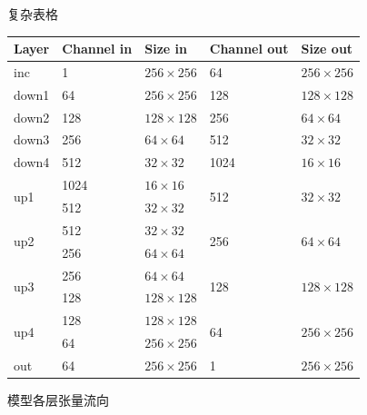 \documentclass{beamer}
\begin{document}
\begin{frame}{复杂表格}
    \centering
    \begin{table}[htb]
        \centering
        \small
        \begin{tabular}{p{2.5cm}p{4cm}p{4cm}p{4cm}p{3.5cm}}
            \toprule
            \textbf{Layer} & \textbf{Channel in} & \textbf{Size in} & \textbf{Channel out} & \textbf{Size out}\\
            \midrule
            inc & 1 & $256\times256$ & 64 & $256\times256$\\
            \midrule
            down1 & 64 & $256\times256$ & 128 & $128\times128$\\
            down2 & 128 & $128\times128$ & 256 & $64\times64$\\
            down3 & 256 & $64\times64$ & 512 & $32\times32$\\
            down4 & 512 & $32\times32$ & 1024 & $16\times16$\\
            \midrule
            \multirow{2}{*}{up1} & 1024 & $16\times16$ & \multirow{2}{*}{512} & \multirow{2}{*}{$32\times32$}\\
             & 512 & $32\times32$ &  & \\
            \midrule
            \multirow{2}{*}{up2} & 512 & $32\times32$ & \multirow{2}{*}{256} & \multirow{2}{*}{$64\times64$}\\
             & 256 & $64\times64$ &  & \\
            \midrule
            \multirow{2}{*}{up3} & 256 & $64\times64$ & \multirow{2}{*}{128} & \multirow{2}{*}{$128\times128$}\\
             & 128 & $128\times128$ &  & \\
            \midrule
            \multirow{2}{*}{up4} & 128 & $128\times128$ & \multirow{2}{*}{64} & \multirow{2}{*}{$256\times256$}\\
             & 64 & $256\times256$ &  & \\
            \midrule
            out & 64 & $256\times256$ & 1 & $256\times256$\\
            \bottomrule
        \end{tabular}
    \end{table}
    \small 模型各层张量流向
\end{frame}
\end{document}
